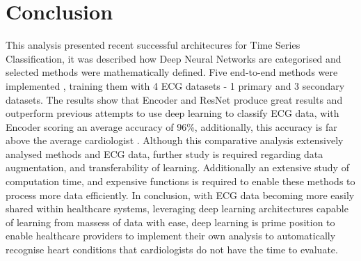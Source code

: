 \documentclass[journal]{IEEEtran}
\begin{document}
\section{Conclusion}
This analysis presented recent successful architecures for Time Series Classification, it was described how Deep Neural Networks are categorised and selected methods were mathematically defined. Five end-to-end methods were implemented , training them with 4 ECG datasets - 1 primary and 3 secondary datasets. The results show that Encoder and ResNet produce great results and outperform previous attempts to use deep learning to classify ECG data, with Encoder scoring an average accuracy of 96\%, additionally, this accuracy is far above the average cardiologist \cite{rajpurkar2017}. Although this comparative analysis extensively analysed methods and ECG data, further study is required regarding data augmentation, and transferability of learning. Additionally an extensive study of computation time, and expensive functions is required to enable these methods to process more data efficiently. In conclusion, with ECG data becoming more easily shared within healthcare systems, leveraging deep learning architectures capable of learning from massess of data with ease, deep learning is prime position to enable healthcare providers to implement their own analysis to automatically recognise heart conditions that cardiologists do not have the time to evaluate.


%
%
\end{document}
